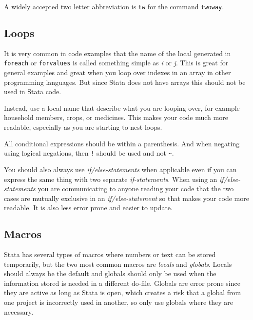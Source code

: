 A widely accepted two letter abbreviation is \verb|tw| for the command \verb|twoway|.

\subsection{Loops}

It is very common in code examples that the name of the local generated in \verb|foreach| or \verb|forvalues| 
is called something simple as \textit{i} or \textit{j}. This is great for general examples and great when you 
loop over indexes in an array in other programming languages. But since Stata does not have arrays this should 
not be used in Stata code.

Instead, use a local name that describe what you are looping over, for example household members, crops, or 
medicines. This makes your code much more readable, especially as you are starting to nest loops.



All conditional expressions should be within a parenthesis. And when negating using logical negations,
then \verb|!| should be used and not \verb|~|.


You should also always use \textit{if/else-statements} when applicable even if you can express the same
thing with two separate \textit{if-statements}. When using an \textit{if/else-statements} you are
communicating to anyone reading your code that the two cases are mutually exclusive in an \textit{if/else-statement} 
so that makes your code more readable. It is also less error prone and easier to update.


\subsection{Macros}

Stata has several types of macros where numbers or text can be stored temporarily, but the two most common
macros are \textit{locals} and \textit{globals}. Locals should always be the default and globals should only 
be used when the information stored is needed in a different do-file. Globals are error prone since they are 
active as long as Stata is open, which creates a risk that a global from one project is incorrectly used in 
another, so only use globals where they are necessary.

